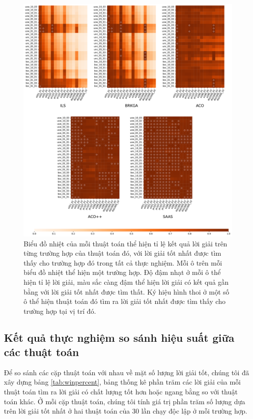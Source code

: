 \begin{figure}
    \centering
    \includegraphics[width=\textwidth]{Figures/profit_ratio.pdf}
    \caption[Kết quả thực nghiệm so sánh lời giải của các thuật toán.]{Biểu đồ nhiệt của mỗi thuật toán thể hiện tỉ lệ kết quả lời giải trên từng trường hợp của thuật toán đó, với lời giải tốt nhất được tìm thấy cho trường hợp đó trong tất cả thực nghiệm. Mỗi ô trên mỗi biểu đồ nhiệt thể hiện một trường hợp. Độ đậm nhạt ở mỗi ô thể hiện tỉ lệ lời giải, màu sắc càng đậm thể hiện lời giải có kết quả gần bằng với lời giải tốt nhất được tìm thất. Ký hiệu hình thoi ở một số ô thể hiện thuật toán đó tìm ra lời giải tốt nhất được tìm thấy cho trường hợp tại vị trí đó.}
    \label{fig:profit_ratio}
\end{figure}
\subsection{Kết quả thực nghiệm so sánh hiệu suất giữa các thuật toán}
\label{sec:winpercent}
Để so sánh các cặp thuật toán với nhau về mặt số lượng lời giải tốt, chúng tôi đã xây dựng bảng \ref{tab:winpercent}, bảng thống kê phần trăm các lời giải của mỗi thuật toán tìm ra lời giải có chất lượng tốt hơn hoặc ngang bằng so với thuật toán khác. Ở mỗi cặp thuật toán, chúng tôi tính giá trị phần trăm số lượng dựa trên lời giải tốt nhất ở hai thuật toán của 30 lần chạy độc lập ở mỗi trường hợp. 

